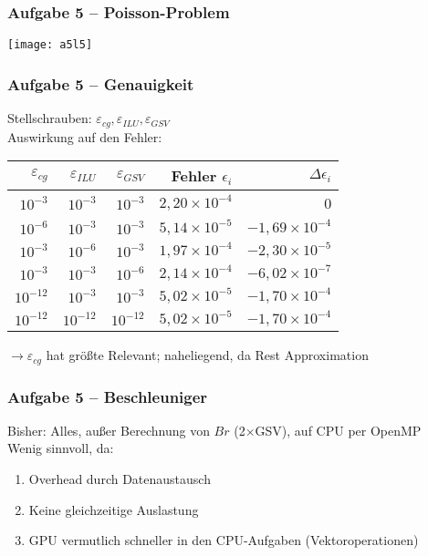 \documentclass[german,notes,18pt]{beamer}
\begin{document}
	\begin{frame}
		\frametitle{Aufgabe 5 -- Poisson-Problem}
		\vspace{-10em}
		\begin{center}
			\texttt{[image: a5l5]}
		\end{center}
	\end{frame}
	\begin{frame}
		\frametitle{Aufgabe 5 -- Genauigkeit}
		Stellschrauben: $\varepsilon_{cg}, \varepsilon_{ILU}, \varepsilon_{GSV}$ \\
		\vspace{2em}
		Auswirkung auf den Fehler:
		\begin{center}
			\begin{tabular}{r|r|r|r|r}
				$\varepsilon_{cg}$ & $\varepsilon_{ILU}$ & $\varepsilon_{GSV}$ & Fehler $\epsilon_i$ & $\Delta\epsilon_i$ \\
				\hline
				$10^{-3}$ & $10^{-3}$ & $10^{-3}$ & $2,20\times10^{-4}$ & 0 \\
				$10^{-6}$ & $10^{-3}$ & $10^{-3}$ & $5,14\times10^{-5}$ & $-1,69\times10^{-4}$ \\
				$10^{-3}$ & $10^{-6}$ & $10^{-3}$ & $1,97\times10^{-4}$ & $-2,30\times10^{-5}$ \\
				$10^{-3}$ & $10^{-3}$ & $10^{-6}$ & $2,14\times10^{-4}$ & $-6,02\times10^{-7}$ \\
				$10^{-12}$ & $10^{-3}$ & $10^{-3}$ & $5,02\times10^{-5}$ & $-1,70\times10^{-4}$ \\
				$10^{-12}$ & $10^{-12}$ & $10^{-12}$ & $5,02\times10^{-5}$ & $-1,70\times10^{-4}$
			\end{tabular}
		\end{center}
	\vspace{2em}
	$\rightarrow$$\varepsilon_{cg}$ hat größte Relevant; naheliegend, da Rest Approximation
	\end{frame}
	\begin{frame}
		\frametitle{Aufgabe 5 -- Beschleuniger}
		Bisher: Alles, außer Berechnung von $Br$ (2$\times$GSV), auf CPU per OpenMP \\
		\vspace{2em}
		Wenig sinnvoll, da:
		\begin{enumerate}
			\item Overhead durch Datenaustausch
			\item Keine gleichzeitige Auslastung
			\item GPU vermutlich schneller in den CPU-Aufgaben (Vektoroperationen)
		\end{enumerate}
	\end{frame}
\end{document}
